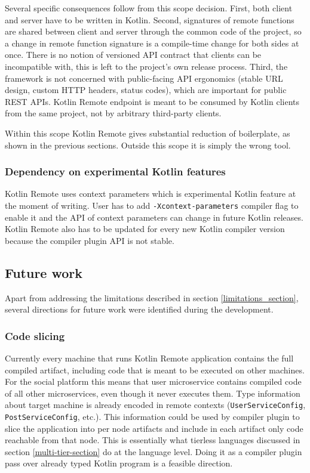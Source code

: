 \documentclass[a4paper,11pt,oneside]{article}
\newcommand{\kotlini}[1]{\texttt{#1}}
\begin{document}
Several specific consequences follow from this scope decision. First, both client and server have
to be written in Kotlin. Second, signatures of remote functions are shared between client and
server through the common code of the project, so a change in remote function signature is a
compile-time change for both sides at once. There is no notion of versioned API contract that
clients can be incompatible with, this is left to the project's own release process. Third, the
framework is not concerned with public-facing API ergonomics (stable URL design, custom HTTP
headers, status codes), which are important for public REST APIs. Kotlin Remote endpoint is meant
to be consumed by Kotlin clients from the same project, not by arbitrary third-party clients.

Within this scope Kotlin Remote gives substantial reduction of boilerplate, as shown in the
previous sections. Outside this scope it is simply the wrong tool.

\subsubsection{Dependency on experimental Kotlin features}

Kotlin Remote uses context parameters which is experimental Kotlin feature at the moment of
writing. User has to add \texttt{-Xcontext-parameters} compiler flag to enable it and the API
of context parameters can change in future Kotlin releases. Kotlin Remote also has to be
updated for every new Kotlin compiler version because the compiler plugin API is not stable.

\subsection{Future work}

Apart from addressing the limitations described in section \ref{limitations_section}, several
directions for future work were identified during the development.

\subsubsection{Code slicing}

Currently every machine that runs Kotlin Remote application contains the full compiled
artifact, including code that is meant to be executed on other machines. For the social
platform this means that user microservice contains compiled code of all other microservices,
even though it never executes them. Type information about target machine is already encoded in
remote contexts (\kotlini{UserServiceConfig}, \kotlini{PostServiceConfig}, etc.). This
information could be used by compiler plugin to slice the application into per node artifacts
and include in each artifact only code reachable from that node. This is essentially what
tierless languages discussed in section \ref{multi-tier-section} do at the language level.
Doing it as a compiler plugin pass over already typed Kotlin program is a feasible direction.
\end{document}
